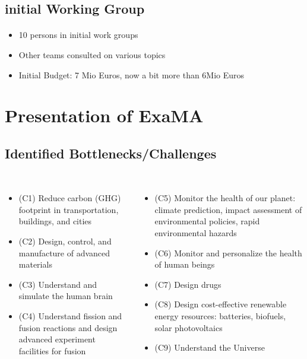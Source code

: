 \subsection{initial Working Group}
\begin{frame}{\insertsectionhead} 
  \framesubtitle{\insertsubsectionhead}
   \begin{itemize}
    \item 10 persons in initial work groups
    \item Other teams consulted on various topics 
    \item Initial Budget: 7 Mio Euros, now a bit more than 6Mio Euros
\end{itemize} 
\end{frame}

\section{Presentation of ExaMA}

\subsection{Identified Bottlenecks/Challenges}

\begin{frame}
  \frametitle{\insertsectionhead}
  \framesubtitle{\insertsubsectionhead}
  \footnotesize
  \begin{columns}
    \begin{itemize}
      \item (C1) Reduce carbon (GHG) footprint in transportation, buildings, and cities
       \item (C2) Design, control, and manufacture of advanced materials
       \item (C3) Understand and simulate the human brain
       \item (C4) Understand fission and fusion reactions and design advanced experiment facilities for fusion
             \end{itemize} 
    \begin{itemize}
      \item (C5) Monitor the health of our planet: climate prediction, impact assessment of environmental policies, rapid environmental hazards

        \item (C6) Monitor and personalize the health of human beings 
       \item (C7) Design drugs
       \item (C8) Design cost-effective renewable energy resources: batteries, biofuels, solar photovoltaics
       \item (C9) Understand the Universe
     \end{itemize} 
  \end{columns}

\end{frame}


